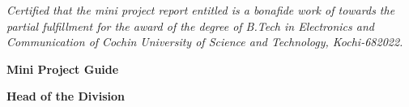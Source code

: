 \vspace*{0cm}
\begin{center}
	\thispagestyle{empty}
	\vspace{1cm}
	\par
	\vspace{1cm}
\end{center}
\vspace{.3cm}
\textit{Certified that the mini project report entitled  is a bonafide work of  towards the partial fulfillment for the award of the degree of B.Tech in Electronics and Communication of Cochin University of Science and Technology, Kochi-682022.
}
\begin{center}
	\vspace{3cm}
	\begin{minipage}[t]{.4\linewidth}
		\begin{flushleft}
			\textbf{Mini Project Guide}\\
		\end{flushleft}
	\end{minipage}%
	\hfill%
	\begin{minipage}[t]{.4\linewidth}%
		\begin{flushright}
			\textbf{Head of the Division}\\
		\end{flushright}
	\end{minipage}
\end{center}
\vspace*{\fill}
